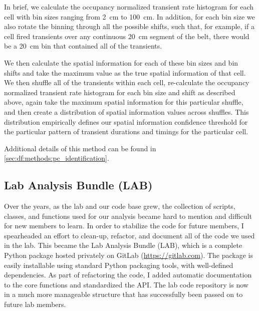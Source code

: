 In brief, we calculate the occupancy normalized transient rate histogram for each cell with bin sizes ranging from 2~cm to 100~cm.
In addition, for each bin size we also rotate the binning through all the possible shifts, such that, for example, if a cell fired transients over any continuous 20~cm segment of the belt, there would be a 20~cm bin that contained all of the transients.

We then calculate the spatial information for each of these bin sizes and bin shifts and take the maximum value as the true spatial information of that cell.
We then shuffle all of the transients within each cell, re-calculate the occupancy normalized transient rate histogram for each bin size and shift as described above, again take the maximum spatial information for this particular shuffle, and then create a distribution of spatial information values across shuffles.
This distribution empirically defines our spatial information confidence threshold for the particular pattern of transient durations and timings for the particular cell.

Additional details of this method can be found in \autoref{sec:df:methods:pc_identification}.
 
\subsection{Lab Analysis Bundle (LAB)}
Over the years, as the lab and our code base grew, the collection of scripts, classes, and functions used for our analysis became hard to mention and difficult for new members to learn.
In order to stabilize the code for future members, I spearheaded an effort to clean-up, refactor, and document all of the code we used in the lab.
This became the Lab Analysis Bundle (LAB), which is a complete Python package hosted privately on GitLab (\url{https://gitlab.com}).
The package is easily installable using standard Python packaging tools, with well-defined dependencies.
As part of refactoring the code, I added automatic documentation to the core functions and standardized the API.
The lab code repository is now in a much more manageable structure that has successfully been passed on to future lab members.

